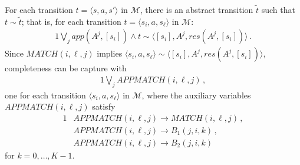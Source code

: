 \documentclass[10pt]{article}
\newcommand{\tup}[1]{\langle #1 \rangle}
\newcommand{\M}{\mathcal{M}}
\begin{document}
For each transition $t=\tup{s,a,s'}$ in $\M$, there is an abstract transition $\tilde t$ such that $t\sim\tilde t$;
that is, for each transition $t=\tup{s_i,a,s_\ell}$ in $\M$:
\begin{alignat}{1}
  \label{eq:completeness}
  \textstyle\bigvee_{j} app(A^j,[s_i]) \land t \sim \tup{[s_i],A^j,res(A^j,[s_i])} \,.
\end{alignat}
Since $MATCH(i,\ell,j)$ implies $\tup{s_i,a,s_\ell}\sim\tup{[s_i],A^j,res(A^j,[s_i])}$,
completeness can be capture with
\begin{alignat}{1}
  \label{eq:completeness}
  \textstyle\bigvee_{j} APPMATCH(i,\ell,j) \,,
\end{alignat}
one for each transition $\tup{s_i,a,s_\ell}$ in $\M$, where the auxiliary variables
$APPMATCH(i,\ell,j)$ satisfy
\begin{alignat}{1}
  &APPMATCH(i,\ell,j) \rightarrow MATCH(i,\ell,j) \,, \\
  &APPMATCH(i,\ell,j) \rightarrow B_1(j,i,k) \,, \\
  &APPMATCH(i,\ell,j) \rightarrow B_2(j,i,k)
\end{alignat}
for $k=0,\ldots,K-1$.
\end{document}
